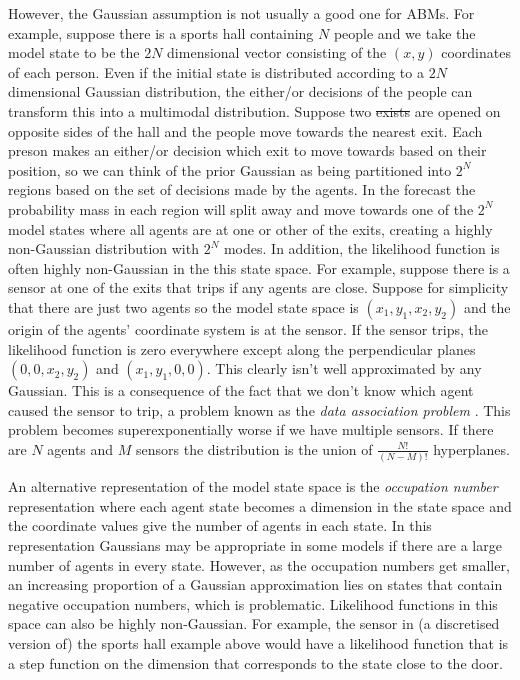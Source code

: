 \documentclass{article}
\providecommand{\DIFaddtex}[1]{{\protect\color{blue}\uwave{#1}}} %
\providecommand{\DIFdeltex}[1]{{\protect\color{red}\sout{#1}}}                      %
\providecommand{\DIFaddbegin}{} %
\providecommand{\DIFaddend}{} %
\providecommand{\DIFdelbegin}{} %
\providecommand{\DIFdelend}{} %
\providecommand{\DIFadd}[1]{\texorpdfstring{\DIFaddtex{#1}}{#1}} %
\providecommand{\DIFdel}[1]{\texorpdfstring{\DIFdeltex{#1}}{}} %
\newcommand{\DIFscaledelfig}{0.5}
\newlength{\DIFdelgraphicswidth} %
\newlength{\DIFdelgraphicsheight} %
\newcommand{\DIFaddincludegraphics}[2][]{{\color{blue}\fbox{\DIFOincludegraphics[#1]{#2}}}} %
\newcommand{\DIFdelincludegraphics}[2][]{%
\sbox{\DIFdelgraphicsbox}{\DIFOincludegraphics[#1]{#2}}%
\settoboxwidth{\DIFdelgraphicswidth}{\DIFdelgraphicsbox} %
\settoboxtotalheight{\DIFdelgraphicsheight}{\DIFdelgraphicsbox} %
\scalebox{\DIFscaledelfig}{%
\parbox[b]{\DIFdelgraphicswidth}{\usebox{\DIFdelgraphicsbox}\\[-\baselineskip] \rule{\DIFdelgraphicswidth}{0em}}\llap{\resizebox{\DIFdelgraphicswidth}{\DIFdelgraphicsheight}{%
\setlength{\unitlength}{\DIFdelgraphicswidth}%
\begin{picture}(1,1)%
\thicklines\linethickness{2pt} %
{\color[rgb]{1,0,0}\put(0,0){\framebox(1,1){}}}%
{\color[rgb]{1,0,0}\put(0,0){\line( 1,1){1}}}%
{\color[rgb]{1,0,0}\put(0,1){\line(1,-1){1}}}%
\end{picture}%
}\hspace*{3pt}}} %
} %
\DeclareRobustCommand{\DIFaddbegin}{\DIFOaddbegin \let\includegraphics\DIFaddincludegraphics} %
\DeclareRobustCommand{\DIFaddend}{\DIFOaddend \let\includegraphics\DIFOincludegraphics} %
\DeclareRobustCommand{\DIFdelbegin}{\DIFOdelbegin \let\includegraphics\DIFdelincludegraphics} %
\DeclareRobustCommand{\DIFdelend}{\DIFOaddend \let\includegraphics\DIFOincludegraphics} %
\begin{document}
However, the Gaussian assumption is not usually a good one for ABMs. For example, suppose there is a sports hall containing $N$ people and we take the model state to be the $2N$ dimensional vector consisting of the $(x,y)$ coordinates of each person. Even if the initial state is distributed according to a $2N$ dimensional Gaussian distribution, the either/or decisions of the people can transform this into a multimodal distribution. Suppose two \DIFdelbegin \DIFdel{exists }\DIFdelend \DIFaddbegin \DIFadd{exits }\DIFaddend are opened on opposite sides of the hall and the people move towards the nearest exit. Each preson makes an either/or decision which exit to move towards based on their position, so we can think of the prior Gaussian as being partitioned into $2^N$ regions based on the set of decisions made by the agents. In the forecast the probability mass in each region will split away and move towards one of the $2^N$ model states where all agents are at one or other of the exits, creating a highly non-Gaussian distribution with $2^N$ modes. In addition, the likelihood function is often highly non-Gaussian in the this state space. For example, suppose there is a sensor at one of the exits that trips if any agents are close. Suppose for simplicity that there are just two agents so the model state space is $(x_1,y_1,x_2,y_2)$ and the origin of the agents' coordinate system is at the sensor. If the sensor trips, the likelihood function is zero everywhere except along the perpendicular planes $(0,0,x_2,y_2)$ and $(x_1,y_1,0,0)$. This clearly isn't well approximated by any Gaussian. This is a consequence of the fact that we don't know which agent caused the sensor to trip, a problem known as the \textit{data association problem} \citep{lueck_who_2019}. This problem becomes superexponentially worse if we have multiple sensors. If there are $N$ agents and $M$ sensors the distribution is the union of $\frac{N!}{(N-M)!}$ hyperplanes.

An alternative representation of the model state space is the \textit{occupation number} representation where each agent state becomes a dimension in the state space and the coordinate values give the number of agents in each state. In this representation Gaussians may be appropriate in some models if there are a large number of agents in every state. However, as the occupation numbers get smaller, an increasing proportion of a Gaussian approximation lies on states that contain negative occupation numbers, which is problematic. Likelihood functions in this space can also be highly non-Gaussian. For example, the sensor in (a discretised version of) the sports hall example above would have a likelihood function that is a step function on the dimension that corresponds to the state close to the door.
\end{document}

